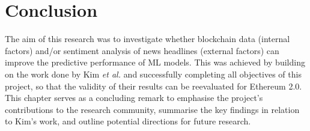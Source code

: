 \documentclass[ %
                    author={Raj Dhakan},
                supervisor={Dr. Ayush Joshi},
                    degree={MSc},
                     title={Ethereum Price Prediction using Internal and External Factors},
                  subtitle={},
                      type={},
                      year={2025}]{dissertation}
\begin{document}





\chapter{Conclusion}
\label{chap:conclusion}
The aim of this research was to investigate whether blockchain data (internal factors) and/or sentiment analysis of news headlines (external factors) can improve the predictive performance of ML models. This was achieved by building on the work done by Kim \textit{et al.} \cite{RN141} and successfully completing all objectives of this project, so that the validity of their results can be reevaluated for Ethereum 2.0. This chapter serves as a concluding remark to emphasise the project's contributions to the research community, summarise the key findings in relation to Kim's work, and outline potential directions for future research.
\end{document}
